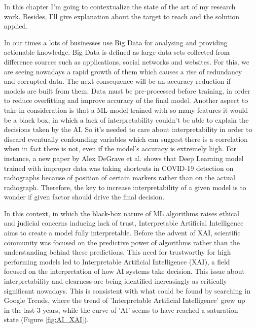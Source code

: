 In this chapter I'm going to contextualize the state of the art of my research work. 
Besides, I'll give explanation about the target to reach and the solution applied.\par
In our times a lots of businesses use Big Data for analysing and providing actionable knowledge.
Big Data is defined as large data sets collected from difference sources such as applications, social networks and websites.
For this, we are seeing nowadays a rapid growth of them which  causes a rise of redundancy and corrupted data.
The next consequence will be an accuracy reduction if models are built from them.
Data must be pre-processed before training, in order to reduce overfitting and improve accuracy of the final model.\newline
Another aspect to take in consideration is that a ML model trained with so many features it would be a black box, in which a lack of interpretability couldn't be able to explain the decisions taken by the AI.
So it's needed to care about interpretability in order to discard eventually confounding variables  which can suggest there is a correlation when in fact there is not, even if the model's accuracy is extremely high. \newline
For instance, a new paper by Alex DeGrave et al.\cite{degrave2021ai} shows that Deep Learning model trained with improper data was taking shortcuts in COVID-19 detection on radiographs because of position of certain markers rather than on the actual radiograph.
Therefore, the key to increase interpretability of a given model is to wonder if given factor should drive the final decision.\par
In this context, in which the black-box nature of ML algorithms raises ethical and judicial concerns inducing lack of trust\cite{9141213}, Interpretable Artificial Intelligence aims to create a model fully interpretable.
Before the advent of XAI, scientific community was focused on the predictive power of algorithms rather than the understanding behind these predictions.
This need for trustworthy for high performing models led to  Interpretable Artificial Intelligence (XAI), a field focused on the interpretation of how AI systems take decision.
This issue about interpretability and clearness are being identified increasingly as critically significant nowadays. 
This is consistent with what could be found by searching in Google Trends, where the trend of 'Interpretable Artificial Intelligence' grew up in the last 3 years, while the curve of  'AI' seems to have reached a saturation state (Figure \ref{fig:AI_XAI}).
